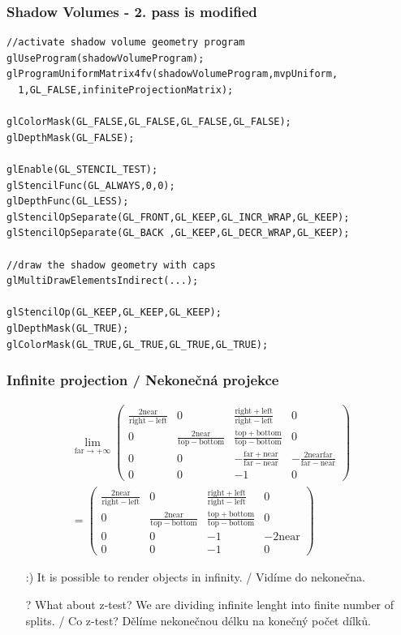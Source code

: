 \begin{frame}[fragile]\frametitle{Shadow Volumes - 2. pass is modified}\scriptsize

\begin{verbatim}
//activate shadow volume geometry program
glUseProgram(shadowVolumeProgram);
glProgramUniformMatrix4fv(shadowVolumeProgram,mvpUniform,
  1,GL_FALSE,infiniteProjectionMatrix);

glColorMask(GL_FALSE,GL_FALSE,GL_FALSE,GL_FALSE);
glDepthMask(GL_FALSE);

glEnable(GL_STENCIL_TEST);
glStencilFunc(GL_ALWAYS,0,0);
glDepthFunc(GL_LESS);
glStencilOpSeparate(GL_FRONT,GL_KEEP,GL_INCR_WRAP,GL_KEEP);
glStencilOpSeparate(GL_BACK ,GL_KEEP,GL_DECR_WRAP,GL_KEEP);

//draw the shadow geometry with caps
glMultiDrawElementsIndirect(...);

glStencilOp(GL_KEEP,GL_KEEP,GL_KEEP);
glDepthMask(GL_TRUE);
glColorMask(GL_TRUE,GL_TRUE,GL_TRUE,GL_TRUE);
  \end{verbatim}
\end{frame}


\begin{frame}\frametitle{Infinite projection / Nekonečná projekce}
\begin{align*}
  \lim_{\mathrm{far} \to +\infty}\begin{pmatrix}
    \frac{2\mathrm{near}}{\mathrm{right}-\mathrm{left}}&0&\frac{\mathrm{right}+\mathrm{left}}{\mathrm{right}-\mathrm{left}}&0\\
    0&\frac{2\mathrm{near}}{\mathrm{top}-\mathrm{bottom}}&\frac{\mathrm{top}+\mathrm{bottom}}{\mathrm{top}-\mathrm{bottom}}&0\\
    0&0&-\frac{\mathrm{far}+\mathrm{near}}{\mathrm{far}-\mathrm{near}}&-\frac{2\mathrm{near}\mathrm{far}}{\mathrm{far}-\mathrm{near}}\\
    0&0&-1&0
  \end{pmatrix} \\
  = \begin{pmatrix}
    \frac{2\mathrm{near}}{\mathrm{right}-\mathrm{left}}&0&\frac{\mathrm{right}+\mathrm{left}}{\mathrm{right}-\mathrm{left}}&0\\
    0&\frac{2\mathrm{near}}{\mathrm{top}-\mathrm{bottom}}&\frac{\mathrm{top}+\mathrm{bottom}}{\mathrm{top}-\mathrm{bottom}}&0\\
    0&0&-1&-2\mathrm{near}\\
    0&0&-1&0
  \end{pmatrix}
\end{align*}
\pause\vfill
\begin{itemize}
  \item[:)] It is possible to render objects in infinity. / Vidíme do nekonečna.
  \item[?] What about z-test? We are dividing infinite lenght into finite number of splits. / Co z-test? Dělíme nekonečnou délku na konečný počet dílků.
\end{itemize}
\end{frame}

